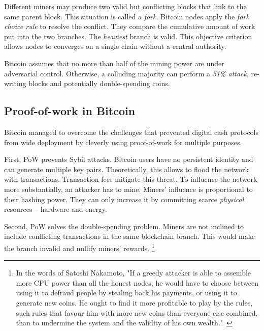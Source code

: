 Different miners may produce two valid but conflicting blocks that link to the same parent block.
This situation is called a \textit{fork}.
Bitcoin nodes apply the \textit{fork choice rule} to resolve the conflict.
They compare the cumulative amount of work put into the two branches.
The \textit{heaviest} branch is valid.
This objective criterion allows nodes to converges on a single chain without a central authority.

Bitcoin assumes that no more than half of the mining power are under adversarial control.
Otherwise, a colluding majority can perform a \textit{51\% attack}, re-writing blocks and potentially double-spending coins.


\subsection{Proof-of-work in Bitcoin}

Bitcoin managed to overcome the challenges that prevented digital cash protocols from wide deployment by cleverly using proof-of-work for multiple purposes.

First, PoW prevents Sybil attacks.
Bitcoin users have no persistent identity and can generate multiple key pairs.
Theoretically, this allows to flood the network with transactions.
Transaction fees mitigate this threat.
To influence the network more substantially, an attacker has to mine.
Miners' influence is proportional to their hashing power.
They can only increase it by committing scarce \textit{physical} resources -- hardware and energy.

Second, PoW solves the double-spending problem.
Miners are not inclined to include conflicting transactions in the same blockchain branch.
This would make the branch invalid and nullify miners' rewards.
\footnote{In the words of Satoshi Nakamoto, "If a greedy attacker is able to assemble more CPU power than all the honest nodes, he would have to choose between using it to defraud people by stealing back his payments, or using it to generate new coins. He ought to find it more profitable to play by the rules, such rules that favour him with more new coins than everyone else combined, than to undermine the system and the validity of his own wealth."~\cite{nakamoto2008bitcoin}}

